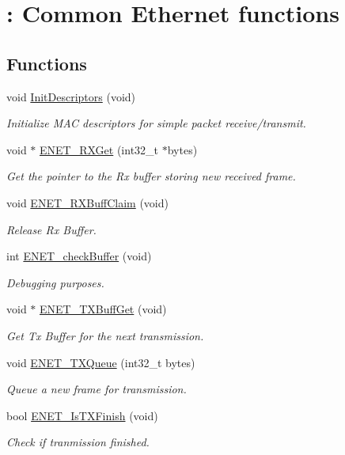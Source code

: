 \hypertarget{group___ethernet}{\section{\+: Common Ethernet functions}
\label{group___ethernet}
}
\subsection*{Functions}
\begin{DoxyCompactItemize}
\item 
void \hyperlink{group___ethernet_gae164e147cf2df8af8084497b287e48f4}{Init\+Descriptors} (void)
\begin{DoxyCompactList}\small\item\em Initialize M\+A\+C descriptors for simple packet receive/transmit. \end{DoxyCompactList}\item 
void $\ast$ \hyperlink{group___ethernet_ga6d20b13e02326e073b3b424243f05445}{E\+N\+E\+T\+\_\+\+R\+X\+Get} (int32\+\_\+t $\ast$bytes)
\begin{DoxyCompactList}\small\item\em Get the pointer to the Rx buffer storing new received frame. \end{DoxyCompactList}\item 
void \hyperlink{group___ethernet_gab1dfb416efdd76fb4af3da14a6a953e6}{E\+N\+E\+T\+\_\+\+R\+X\+Buff\+Claim} (void)
\begin{DoxyCompactList}\small\item\em Release Rx Buffer. \end{DoxyCompactList}\item 
int \hyperlink{group___ethernet_ga85a93c7b190918bb7d07a19f82820c2a}{E\+N\+E\+T\+\_\+check\+Buffer} (void)
\begin{DoxyCompactList}\small\item\em Debugging purposes. \end{DoxyCompactList}\item 
void $\ast$ \hyperlink{group___ethernet_ga8139791d0554b1ba4accdab65de42861}{E\+N\+E\+T\+\_\+\+T\+X\+Buff\+Get} (void)
\begin{DoxyCompactList}\small\item\em Get Tx Buffer for the next transmission. \end{DoxyCompactList}\item 
void \hyperlink{group___ethernet_gaf45704cbe2caeecbb76caf5804fb987d}{E\+N\+E\+T\+\_\+\+T\+X\+Queue} (int32\+\_\+t bytes)
\begin{DoxyCompactList}\small\item\em Queue a new frame for transmission. \end{DoxyCompactList}\item 
bool \hyperlink{group___ethernet_ga9eac02c3e323091545e54ee497247975}{E\+N\+E\+T\+\_\+\+Is\+T\+X\+Finish} (void)
\begin{DoxyCompactList}\small\item\em Check if tranmission finished. \end{DoxyCompactList}\end{DoxyCompactItemize}


